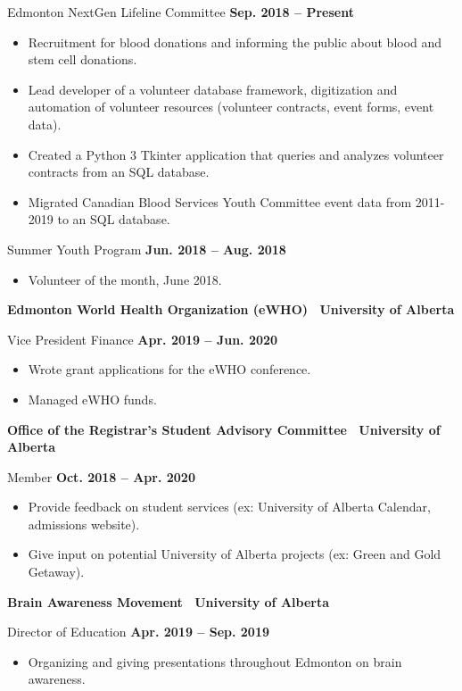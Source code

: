 \documentclass{article}
\begin{document}
    Edmonton NextGen Lifeline Committee \hfill \textbf{Sep. 2018 -- Present}
    \begin{itemize}
        \item Recruitment for blood donations and informing the public about blood and stem cell donations.
        \item Lead developer of a volunteer database framework, digitization and automation of volunteer resources (volunteer contracts, event forms, event data).
        \item Created a Python 3 Tkinter application that queries and analyzes volunteer contracts from an SQL database.
        \item Migrated Canadian Blood Services Youth Committee event data from 2011-2019 to an SQL database.
    \end{itemize}

    Summer Youth Program \hfill \textbf{Jun. 2018 -- Aug. 2018}
    \begin{itemize}
        \item Volunteer of the month, June 2018.
    \end{itemize}
    
    
    \textbf{Edmonton World Health Organization (eWHO) \textbar\ University of Alberta}

    Vice President Finance \hfill \textbf{Apr. 2019 -- Jun. 2020}
    \begin{itemize}
        \item Wrote grant applications for the eWHO conference.
        \item Managed eWHO funds.
    \end{itemize}
    

    \textbf{Office of the Registrar's  Student Advisory Committee \textbar\ University of Alberta}

    Member \hfill \textbf{Oct. 2018 -- Apr. 2020}
    \begin{itemize}
        \item Provide feedback on student services (ex: University of Alberta Calendar, admissions website).
        \item Give input on potential University of Alberta projects (ex: Green and Gold Getaway).
    \end{itemize}


    \textbf{Brain Awareness Movement \textbar\ University of Alberta}

    Director of Education \hfill \textbf{Apr. 2019 -- Sep. 2019}
    \begin{itemize}
        \item Organizing and giving presentations throughout Edmonton on brain awareness.
    \end{itemize}
\end{document}
